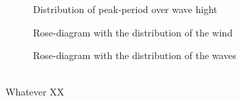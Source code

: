 \begin{figure}[H]
\center
{}
\caption[Distribution of peak-period over wave hight]{Distribution of peak-period over wave hight}
\end{figure}
% 
% 
\begin{figure}[H]
\center
{}
\caption{Rose-diagram with the distribution of the wind}
\end{figure}
% 
% 
\begin{figure}[H]
\center
{}
\caption{Rose-diagram with the distribution of the waves}
\end{figure}
\\
Whatever XX

